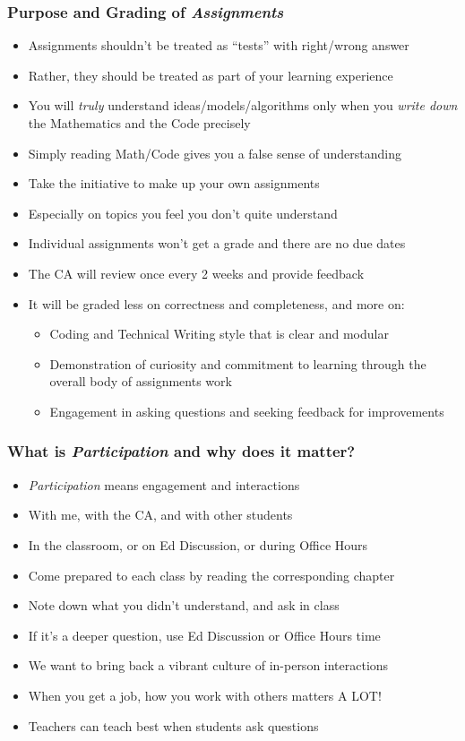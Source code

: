 \documentclass[handout]{beamer}
\begin{document}
\begin{frame}
\frametitle{Purpose and Grading of {\em Assignments}}
\pause
\begin{itemize}[<+->]
\item Assignments shouldn't be treated as ``tests'' with right/wrong answer
\item Rather, they should be treated as part of your learning experience
\item You will {\em truly} understand ideas/models/algorithms only when you {\em write down} the Mathematics and the Code precisely
\item Simply reading Math/Code gives you a false sense of understanding
\item Take the initiative to make up your own assignments
\item Especially on topics you feel you don't quite understand
\item Individual assignments won't get a grade and there are no due dates
\item The CA will review once every 2 weeks and provide feedback
\item It will be graded less on correctness and completeness, and more on:
\begin{itemize}
\item Coding and Technical Writing style that is clear and modular
\item Demonstration of curiosity and commitment to learning through the overall body of assignments work
\item Engagement in asking questions and seeking feedback for improvements
\end{itemize}
\end{itemize}
\end{frame}

\begin{frame}
\frametitle{What is {\em Participation} and why does it matter?}
\pause
\begin{itemize}[<+->]
\item {\em Participation} means engagement and interactions
\item With me, with the CA, and with other students
\item In the classroom, or on Ed Discussion, or during Office Hours
\item Come prepared to each class by reading the corresponding chapter
\item Note down what you didn't understand, and ask in class
\item If it's a deeper question, use Ed Discussion or Office Hours time
\item We want to bring back a vibrant culture of in-person interactions
\item When you get a job, how you work with others matters A LOT!
\item Teachers can teach best when students ask questions
\end{itemize}
\end{frame}
\end{document}
